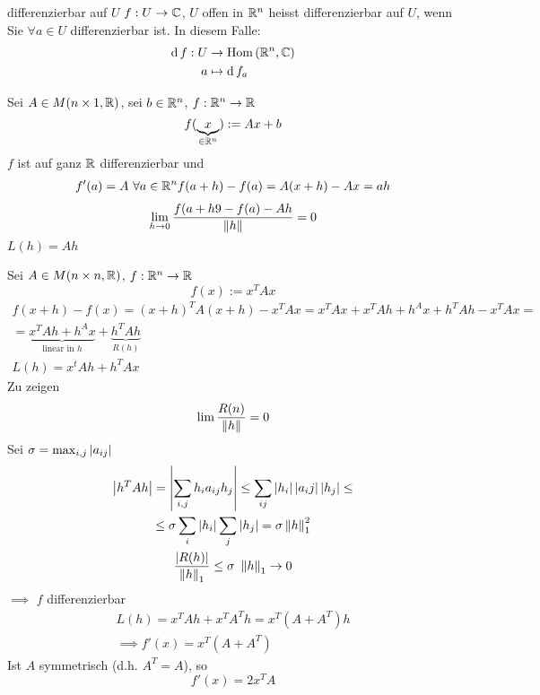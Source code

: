 \begin{Def}{differenzierbar auf $U$}
  $f:U\to\mathbb{C}$, $U$ offen in $\mathbb{R}^n$ heisst differenzierbar auf $U$, wenn Sie $\forall a\in U$ differenzierbar ist. In diesem Falle:
  \begin{align*}
    \operatorname{d} f:U&\to\operatorname{Hom}\left( \mathbb{R}^n,\mathbb{C} \right)\\
    a&\mapsto\operatorname{d} f_a
  \end{align*}
\end{Def}
\begin{Bsp}
  Sei $A\in M(n\times 1,\mathbb{R})$, sei $b\in\mathbb{R}^n$, $f:\mathbb{R}^n\to\mathbb{R}$
  \[f(\underbrace{x}_{\in\mathbb{R}^n}):=Ax+b\]
  $f$ ist auf ganz $\mathbb{R}$ differenzierbar und 
  \begin{gather*}
    f'(a)=A\ \forall a\in\mathbb{R}^n
    f(a+h)-f(a)=A(x+h)-Ax=ah
  \end{gather*}
  \[\displaystyle\lim_{h\rightarrow0}\frac{f(a+h9-f(a)-Ah}{\left\| h \right\|}=0\]
  $L(h)=Ah$
\end{Bsp}
\begin{Bsp}
  Sei $A\in M(n\times n,\mathbb{R})$, $f:\mathbb{R}^n\to\mathbb{R}$
  \[f(x):=x^TAx\]
  \begin{gather*}
    f(x+h)-f(x)=(x+h)^TA(x+h)-x^TAx=x^TAx+x^TAh+h^Ax+h^TAh-x^TAx=\\
    =\underbrace{x^TAh+h^Ax}_{\text{linear in $h$}}+\underbrace{h^TAh}_{R(h)}\\
    L(h)=x^tAh+h^TAx
  \end{gather*}
  Zu zeigen
  \[\lim\frac{R(n)}{\left\| h \right\|}=0\]
  Sei $\sigma=\max_{i,j}\left| a_{ij} \right|$
  \begin{gather*}
    \left| h^TAh \right|=\left| \sum_{i,j}h_ia_{ij}h_j \right|\leq\sum_{ij}\left| h_i \right|\left| a_ij \right|\left| h_j \right|\leq\\
    \leq \sigma\sum_i\left| h_i \right|\sum_j\left| h_j \right|=\sigma\left\| h \right\|^2_1\\
    \frac{\left| R(h) \right|}{\left\| h \right\|_1}\leq\sigma\ \left\| h \right\|_1\to 0
  \end{gather*}
  $\implies$ $f$ differenzierbar
  \begin{gather*}
    L(h)=x^TAh+x^TA^Th=x^T(A+A^T)h\\
    \implies f'(x)=x^T(A+A^T)
  \end{gather*}
  Ist $A$ symmetrisch (d.h. $A^T=A$), so
  \[f'(x)=2x^TA\]
\end{Bsp}
